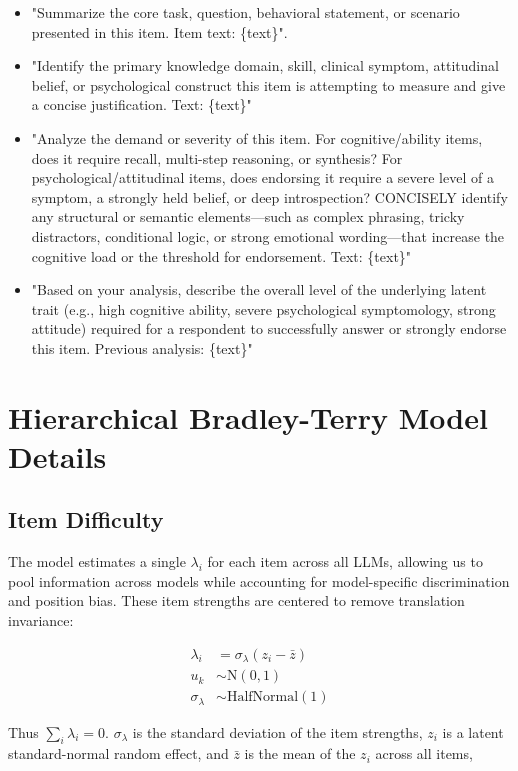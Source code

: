 \documentclass[11pt]{article}
\begin{document}
\begin{itemize}
  \item "Summarize the core task, question, behavioral statement, or scenario presented in this item. Item text: \{text\}".
  \item "Identify the primary knowledge domain, skill, clinical symptom, attitudinal belief, or psychological construct this item is attempting to measure and give a concise justification. Text: \{text\}"
  \item "Analyze the demand or severity of this item. For cognitive/ability items, does it require recall, multi-step reasoning, or synthesis? For psychological/attitudinal items, does endorsing it require a severe level of a symptom, a strongly held belief, or deep introspection? CONCISELY identify any structural or semantic elements—such as complex phrasing, tricky distractors, conditional logic, or strong emotional wording—that increase the cognitive load or the threshold for endorsement. Text: \{text\}"
  \item "Based on your analysis, describe the overall level of the underlying latent trait (e.g., high cognitive ability, severe psychological symptomology, strong attitude) required for a respondent to successfully answer or strongly endorse this item. Previous analysis: \{text\}"
\end{itemize}

\section{Hierarchical Bradley-Terry Model Details}
\label{app:bradley_terry}

\subsection{Item Difficulty}
\label{appsubsec:item_parameters}
The model estimates a single $\lambda_i$ for each item across all LLMs, allowing us to pool information across models while accounting for model-specific discrimination and position bias. These item strengths are centered to remove translation invariance: 

\[
\begin{aligned}
\lambda_i &= \sigma_{\lambda}(z_i - \bar{z}) \\
u_k &\sim \text{N}(0, 1) \\
\sigma_{\lambda} &\sim \text{HalfNormal}(1)
\end{aligned}
\]

Thus $\sum_i{\lambda_i} = 0$. $\sigma_{\lambda}$ is the standard deviation of the item strengths, $z_i$ is a latent standard-normal random effect, and $\bar{z}$ is the mean of the $z_i$ across all items,
\end{document}
